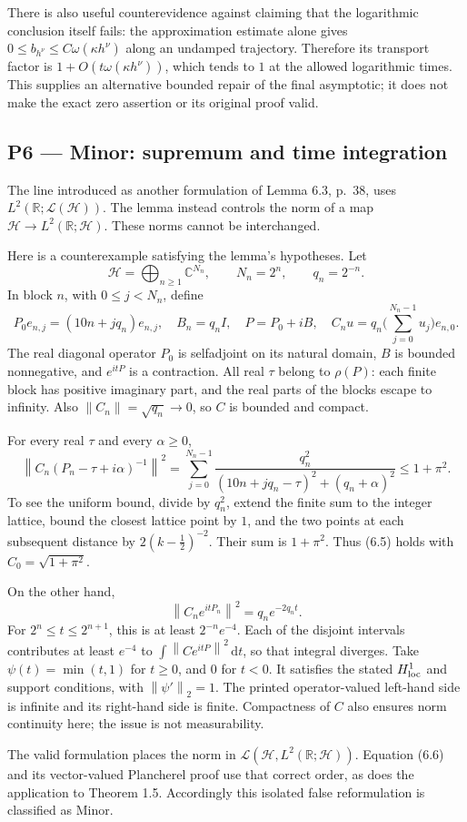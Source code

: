\documentclass[10pt]{article}
\begin{document}
There is also useful counterevidence against claiming that the logarithmic conclusion itself fails: the approximation estimate alone gives \(0\leq b_{h^\nu}\leq C\omega(\kappa h^\nu)\) along an undamped trajectory. Therefore its transport factor is \(1+O(t\omega(\kappa h^\nu))\), which tends to \(1\) at the allowed logarithmic times. This supplies an alternative bounded repair of the final asymptotic; it does not make the exact zero assertion or its original proof valid.\par
\subsection*{P6 — Minor: supremum and time integration}
The line introduced as another formulation of Lemma 6.3, p. 38, uses \(L^2(\mathbb R;\mathcal L(\mathcal H))\). The lemma instead controls the norm of a map \(\mathcal H\to L^2(\mathbb R;\mathcal H)\). These norms cannot be interchanged.\par
Here is a counterexample satisfying the lemma’s hypotheses. Let \[\mathcal H=\bigoplus_{n\geq1}\mathbb C^{N_n},\qquad
 N_n=2^n,\qquad q_n=2^{-n}.\] In block \(n\), with \(0\leq j<N_n\), define \[P_0e_{n,j}=(10n+jq_n)e_{n,j},\quad
 B_n=q_n I,\quad P=P_0+iB,\quad
 C_nu=q_n\Big(\sum_{j=0}^{N_n-1}u_j\Big)e_{n,0}.\] The real diagonal operator \(P_0\) is selfadjoint on its natural domain, \(B\) is bounded nonnegative, and \(e^{itP}\) is a contraction. All real \(\tau\) belong to \(\rho(P)\): each finite block has positive imaginary part, and the real parts of the blocks escape to infinity. Also \(\left\|C_n\right\|=\sqrt{q_n}\to0\), so \(C\) is bounded and compact.\par
For every real \(\tau\) and every \(\alpha\geq0\), \[\left\|C_n(P_n-\tau+i\alpha)^{-1}\right\|^2
 =\sum_{j=0}^{N_n-1}
 \frac{q_n^2}{(10n+jq_n-\tau)^2+(q_n+\alpha)^2}
 \leq1+\pi^2 .\] To see the uniform bound, divide by \(q_n^2\), extend the finite sum to the integer lattice, bound the closest lattice point by \(1\), and the two points at each subsequent distance by \(2(k-\tfrac12)^{-2}\). Their sum is \(1+\pi^2\). Thus (6.5) holds with \(C_0=\sqrt{1+\pi^2}\).\par
On the other hand, \[\left\|C_ne^{itP_n}\right\|^2=q_n e^{-2q_nt}.\] For \(2^n\leq t\leq2^{n+1}\), this is at least \(2^{-n}e^{-4}\). Each of the disjoint intervals contributes at least \(e^{-4}\) to \(\int\left\|Ce^{itP}\right\|^2\,\mathrm dt\), so that integral diverges. Take \(\psi(t)=\min(t,1)\) for \(t\geq0\), and \(0\) for \(t<0\). It satisfies the stated \(H^1_{\rm loc}\) and support conditions, with \(\left\|\psi'\right\|_2=1\). The printed operator-valued left-hand side is infinite and its right-hand side is finite. Compactness of \(C\) also ensures norm continuity here; the issue is not measurability.\par
The valid formulation places the norm in \(\mathcal L(\mathcal H,L^2(\mathbb R;\mathcal H))\). Equation (6.6) and its vector-valued Plancherel proof use that correct order, as does the application to Theorem 1.5. Accordingly this isolated false reformulation is classified as Minor.\par
\end{document}
